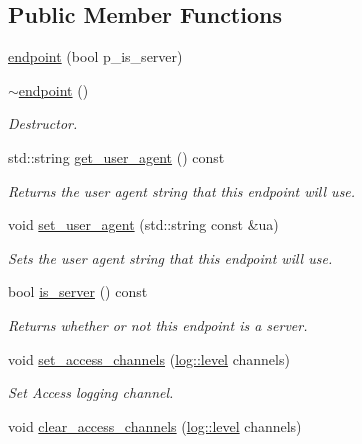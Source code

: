 \subsection*{Public Member Functions}
\begin{DoxyCompactItemize}
\item 
\hyperlink{classwebsocketpp_1_1endpoint_a12015b0910fe39d0cbbd7fc7ea5ffcfd}{endpoint} (bool p\+\_\+is\+\_\+server)
\item 
\hyperlink{classwebsocketpp_1_1endpoint_a4fea6c12eff3d5326d13731a08df2f9e}{$\sim$endpoint} ()
\begin{DoxyCompactList}\small\item\em Destructor. \end{DoxyCompactList}\item 
std\+::string \hyperlink{classwebsocketpp_1_1endpoint_a6791170d75bc673d07262207ed61493a}{get\+\_\+user\+\_\+agent} () const 
\begin{DoxyCompactList}\small\item\em Returns the user agent string that this endpoint will use. \end{DoxyCompactList}\item 
void \hyperlink{classwebsocketpp_1_1endpoint_a06a703c52196d900d1e58b79d6657cc8}{set\+\_\+user\+\_\+agent} (std\+::string const \&ua)
\begin{DoxyCompactList}\small\item\em Sets the user agent string that this endpoint will use. \end{DoxyCompactList}\item 
bool \hyperlink{classwebsocketpp_1_1endpoint_a5fc8ad1f8314d2e15d97206052db0676}{is\+\_\+server} () const 
\begin{DoxyCompactList}\small\item\em Returns whether or not this endpoint is a server. \end{DoxyCompactList}\item 
void \hyperlink{classwebsocketpp_1_1endpoint_a5d7da609ebd2f797e5e67b6d050ebc59}{set\+\_\+access\+\_\+channels} (\hyperlink{namespacewebsocketpp_1_1log_a12d4d17939f102db8c9183d400a41960}{log\+::level} channels)
\begin{DoxyCompactList}\small\item\em Set Access logging channel. \end{DoxyCompactList}\item 
void \hyperlink{classwebsocketpp_1_1endpoint_a3fe357b3c6434273a9965eb52902575d}{clear\+\_\+access\+\_\+channels} (\hyperlink{namespacewebsocketpp_1_1log_a12d4d17939f102db8c9183d400a41960}{log\+::level} channels)

\end{DoxyCompactItemize}
